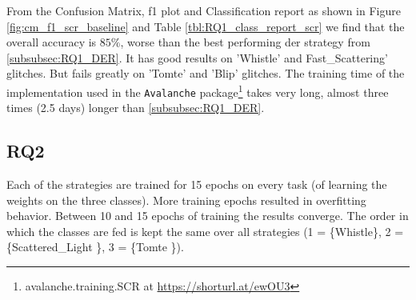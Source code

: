 From the Confusion Matrix, f1 plot and Classification report as shown in Figure \ref{fig:cm_f1_scr_baseline} and Table \ref{tbl:RQ1_class_report_scr} we find that the overall accuracy is $85\%$, worse than the best performing \acrshort{der} strategy from \ref{subsubsec:RQ1_DER}. It has good results on 'Whistle' and Fast\_Scattering' glitches. But fails greatly on 'Tomte' and 'Blip' glitches.
The training time of the implementation used in the \verb|Avalanche| package\footnote{avalanche.training.SCR at  \url{https://shorturl.at/ewOU3}} takes very long, almost three times (2.5 days) longer than \ref{subsubsec:RQ1_DER}. 

\subsection{RQ2}
\label{subsec:RQ2}
Each of the strategies are trained for 15 epochs on every task (of learning the weights on the three classes). More training epochs resulted in overfitting behavior. Between 10 and 15 epochs of training the results converge. The order in which the classes are fed is kept the same over all strategies (1 = \{Whistle\}, 2 = \{Scattered\_Light \}, 3 = \{Tomte \}).


